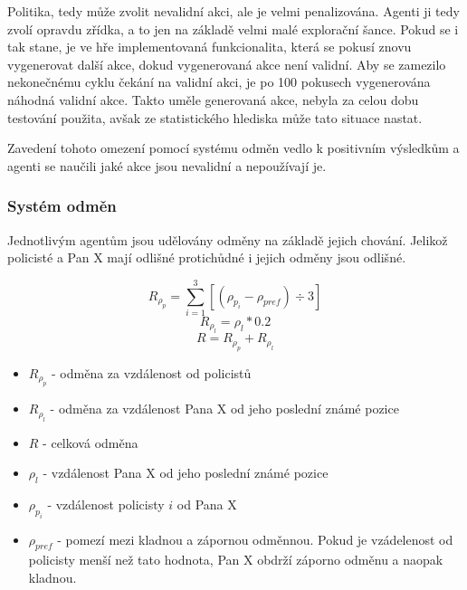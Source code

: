 Politika, tedy může zvolit nevalidní akci, ale je velmi penalizována.
Agenti ji tedy zvolí opravdu zřídka, a to jen na základě velmi malé explorační šance.
Pokud se i tak stane, je ve hře implementovaná funkcionalita, která se pokusí znovu vygenerovat další akce, dokud vygenerovaná akce není validní.
Aby se zamezilo nekonečnému cyklu čekání na validní akci, je po 100 pokusech vygenerována náhodná validní akce.
Takto uměle generovaná akce, nebyla za celou dobu testování použita, avšak ze statistického hlediska může tato situace nastat.

Zavedení tohoto omezení pomocí systému odměn vedlo k positivním výsledkům a agenti se naučili jaké akce jsou nevalidní a nepoužívají je.

\subsubsection*{Systém odměn}

Jednotlivým agentům jsou udělovány odměny na základě jejich chování.
Jelikož policisté a Pan X mají odlišné protichůdné i jejich odměny jsou odlišné.

\begin{equation}
    \label{eq:odmena_za_vzdalenost_od_policisty}
  R_{\rho_p} = \sum_{i=1}^{3}[(\rho_{p_i} - \rho_{pref}) \div 3]
\end{equation}
\begin{equation}
    \label{eq:odmena_za_vzdalenost_od_posledni_pozice}
  R_{\rho_l} = \rho_l * 0.2
\end{equation}
\begin{equation}
    \label{eq:celkova_odmena}
  R = R_{\rho_p} + R_{\rho_l}
\end{equation}

\begin{itemize}
  \item $R_{\rho_p}$ - odměna za vzdálenost od policistů
  \item $R_{\rho_l}$ - odměna za vzdálenost Pana X od jeho poslední známé pozice
  \item $R$ - celková odměna
  \item $\rho_l$ - vzdálenost Pana X od jeho poslední známé pozice
  \item $\rho_{p_i}$ - vzdálenost policisty $i$ od Pana X
  \item $\rho_{pref}$ - pomezí mezi kladnou a zápornou odměnnou.
  Pokud je vzádelenost od policisty menší než tato hodnota, Pan X obdrží záporno odměnu a naopak kladnou.
\end{itemize}

